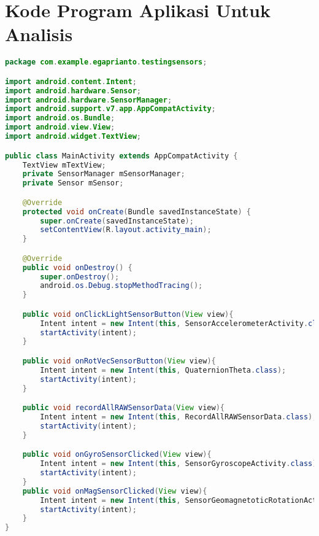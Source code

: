 \chapter{Kode Program Aplikasi Untuk Analisis}
\label{app:A}

\singlespacing 
%
%
\begin{lstlisting}[language=Java,basicstyle=\tiny,caption=MainActivity.java]
package com.example.egaprianto.testingsensors;

import android.content.Intent;
import android.hardware.Sensor;
import android.hardware.SensorManager;
import android.support.v7.app.AppCompatActivity;
import android.os.Bundle;
import android.view.View;
import android.widget.TextView;

public class MainActivity extends AppCompatActivity {
    TextView mTextView; 
    private SensorManager mSensorManager;
    private Sensor mSensor;

    @Override
    protected void onCreate(Bundle savedInstanceState) {
        super.onCreate(savedInstanceState);
        setContentView(R.layout.activity_main);
    }

    @Override
    public void onDestroy() {
        super.onDestroy();
        android.os.Debug.stopMethodTracing();
    }

    public void onClickLightSensorButton(View view){
        Intent intent = new Intent(this, SensorAccelerometerActivity.class);
        startActivity(intent);
    }

    public void onRotVecSensorButton(View view){
        Intent intent = new Intent(this, QuaternionTheta.class);
        startActivity(intent);
    }

    public void recordAllRAWSensorData(View view){
        Intent intent = new Intent(this, RecordAllRAWSensorData.class);
        startActivity(intent);
    }

    public void onGyroSensorClicked(View view){
        Intent intent = new Intent(this, SensorGyroscopeActivity.class);
        startActivity(intent);
    }
    public void onMagSensorClicked(View view){
        Intent intent = new Intent(this, SensorGeomagnetoticRotationActivity.class);
        startActivity(intent);
    }
}

\end{lstlisting}
